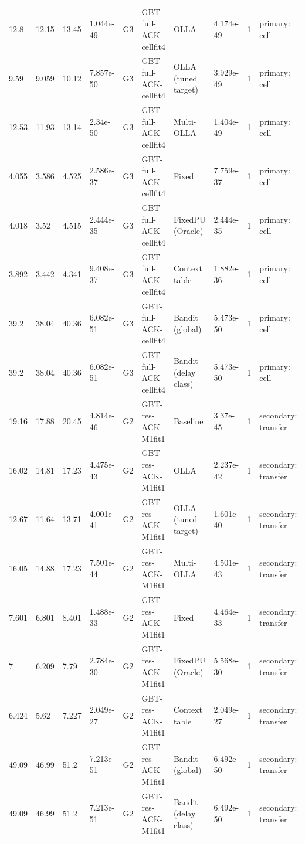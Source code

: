 \documentclass[10pt]{article}
\begin{document}
\begin{landscape}
\begin{longtable}{@{}llllllllll@{}}
12.8 & 12.15 & 13.45 & 1.044e-49 & G3 & GBT-full-ACK-cellfit4 & OLLA & 4.174e-49 & 1 & primary: cell \\
9.59 & 9.059 & 10.12 & 7.857e-50 & G3 & GBT-full-ACK-cellfit4 & OLLA (tuned target) & 3.929e-49 & 1 & primary: cell \\
12.53 & 11.93 & 13.14 & 2.34e-50 & G3 & GBT-full-ACK-cellfit4 & Multi-OLLA & 1.404e-49 & 1 & primary: cell \\
4.055 & 3.586 & 4.525 & 2.586e-37 & G3 & GBT-full-ACK-cellfit4 & Fixed & 7.759e-37 & 1 & primary: cell \\
4.018 & 3.52 & 4.515 & 2.444e-35 & G3 & GBT-full-ACK-cellfit4 & FixedPU (Oracle) & 2.444e-35 & 1 & primary: cell \\
3.892 & 3.442 & 4.341 & 9.408e-37 & G3 & GBT-full-ACK-cellfit4 & Context table & 1.882e-36 & 1 & primary: cell \\
39.2 & 38.04 & 40.36 & 6.082e-51 & G3 & GBT-full-ACK-cellfit4 & Bandit (global) & 5.473e-50 & 1 & primary: cell \\
39.2 & 38.04 & 40.36 & 6.082e-51 & G3 & GBT-full-ACK-cellfit4 & Bandit (delay class) & 5.473e-50 & 1 & primary: cell \\
19.16 & 17.88 & 20.45 & 4.814e-46 & G2 & GBT-res-ACK-M1fit1 & Baseline & 3.37e-45 & 1 & secondary: transfer \\
16.02 & 14.81 & 17.23 & 4.475e-43 & G2 & GBT-res-ACK-M1fit1 & OLLA & 2.237e-42 & 1 & secondary: transfer \\
12.67 & 11.64 & 13.71 & 4.001e-41 & G2 & GBT-res-ACK-M1fit1 & OLLA (tuned target) & 1.601e-40 & 1 & secondary: transfer \\
16.05 & 14.88 & 17.23 & 7.501e-44 & G2 & GBT-res-ACK-M1fit1 & Multi-OLLA & 4.501e-43 & 1 & secondary: transfer \\
7.601 & 6.801 & 8.401 & 1.488e-33 & G2 & GBT-res-ACK-M1fit1 & Fixed & 4.464e-33 & 1 & secondary: transfer \\
7 & 6.209 & 7.79 & 2.784e-30 & G2 & GBT-res-ACK-M1fit1 & FixedPU (Oracle) & 5.568e-30 & 1 & secondary: transfer \\
6.424 & 5.62 & 7.227 & 2.049e-27 & G2 & GBT-res-ACK-M1fit1 & Context table & 2.049e-27 & 1 & secondary: transfer \\
49.09 & 46.99 & 51.2 & 7.213e-51 & G2 & GBT-res-ACK-M1fit1 & Bandit (global) & 6.492e-50 & 1 & secondary: transfer \\
49.09 & 46.99 & 51.2 & 7.213e-51 & G2 & GBT-res-ACK-M1fit1 & Bandit (delay class) & 6.492e-50 & 1 & secondary: transfer \\

\end{longtable}
\end{landscape}
\end{document}
